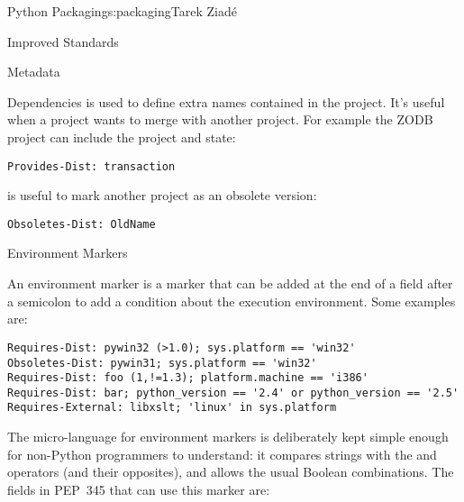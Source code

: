 \begin{aosachapter}{Python Packaging}{s:packaging}{Tarek Ziad\'{e}}
\begin{aosasect1}{Improved Standards}
\begin{aosasect2}{Metadata}
\begin{aosasect3}{Dependencies}
\noindent {} is used to define extra names contained in the
project.  It's useful when a project wants to merge with another
project. For example the ZODB project can include the
 project and state:

\begin{verbatim}
Provides-Dist: transaction
\end{verbatim}

\noindent {} is useful to mark another project as an obsolete
version:

\begin{verbatim}
Obsoletes-Dist: OldName
\end{verbatim}

\end{aosasect3}

\begin{aosasect3}{Environment Markers}

An environment marker is a marker that can be added at the end of a
field after a semicolon to add a condition about the execution
environment.  Some examples are:

\begin{verbatim}
Requires-Dist: pywin32 (>1.0); sys.platform == 'win32'
Obsoletes-Dist: pywin31; sys.platform == 'win32'
Requires-Dist: foo (1,!=1.3); platform.machine == 'i386'
Requires-Dist: bar; python_version == '2.4' or python_version == '2.5'
Requires-External: libxslt; 'linux' in sys.platform
\end{verbatim}

The micro-language for environment markers is deliberately kept simple
enough for non-Python programmers to understand: it compares strings
with the \code{==} and  operators (and their opposites), and
allows the usual Boolean combinations.  The fields in PEP~345 that can
use this marker are:

\begin{aosaitemize}
  \item {}
  \item {}
  \item {}
  \item {}
  \item {}
  \item {}
\end{aosaitemize}

\end{aosasect3}


\end{aosasect2}
\end{aosasect1}
\end{aosachapter}
